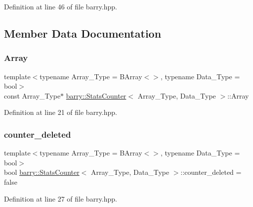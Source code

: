 Definition at line 46 of file barry.\+hpp.



\subsection{Member Data Documentation}
\mbox{\label{classbarry_1_1_stats_counter_a4a963a5edf23d0527e1ef87c52c04a97}} 
\subsubsection{\texorpdfstring{Array}{Array}}
{\footnotesize\ttfamily template$<$typename Array\+\_\+\+Type = B\+Array$<$$>$, typename Data\+\_\+\+Type = bool$>$ \\
const Array\+\_\+\+Type$\ast$ \hyperlink{classbarry_1_1_stats_counter}{barry\+::\+Stats\+Counter}$<$ Array\+\_\+\+Type, Data\+\_\+\+Type $>$\+::Array}



Definition at line 21 of file barry.\+hpp.

\mbox{\label{classbarry_1_1_stats_counter_a0e9924b44520a91c7384a464fa9711b7}} 
\subsubsection{\texorpdfstring{counter\+\_\+deleted}{counter\_deleted}}
{\footnotesize\ttfamily template$<$typename Array\+\_\+\+Type = B\+Array$<$$>$, typename Data\+\_\+\+Type = bool$>$ \\
bool \hyperlink{classbarry_1_1_stats_counter}{barry\+::\+Stats\+Counter}$<$ Array\+\_\+\+Type, Data\+\_\+\+Type $>$\+::counter\+\_\+deleted = false}



Definition at line 27 of file barry.\+hpp.

\mbox{\label{classbarry_1_1_stats_counter_a7100901cfe8f02c96b76b381fa06f94c}} 
